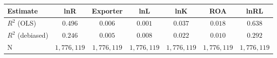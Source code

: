 \begin{tabular}{l*{6}{c}}
\hline\hline
 Estimate & lnR & Exporter & lnL & lnK & ROA & lnRL \\
\hline
\addlinespace $ R^2$ (OLS) & $0.496$ & $0.006$ & $0.001$ & $0.037$ & $0.018$ & $0.638$ \\
$ R^2$ (debiased) & $0.246$ & $0.005$ & $0.008$ & $0.022$ & $0.010$ & $0.292$ \\
N & $1,776,119$ & $1,776,119$ & $1,776,119$ & $1,776,119$ & $1,776,119$ & $1,776,119$ \\
\hline\hline
\end{tabular}
